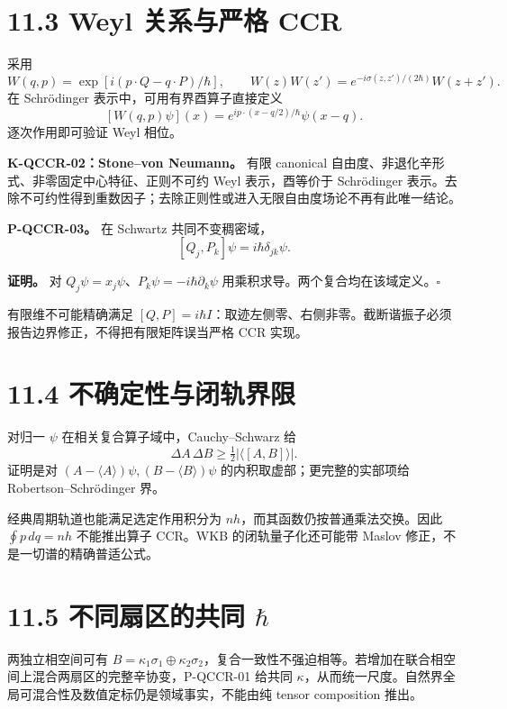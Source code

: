 \documentclass[
  11pt,
  oneside]{book}
\begin{document}
\section{11.3 Weyl 关系与严格 CCR}

采用 \[
W(q,p)=\exp[i(p\cdot Q-q\cdot P)/\hbar],\qquad
W(z)W(z')=e^{-i\sigma(z,z')/(2\hbar)}W(z+z').
\] 在 Schrödinger 表示中，可用有界酉算子直接定义 \[
[W(q,p)\psi](x)=e^{ip\cdot(x-q/2)/\hbar}\psi(x-q).
\] 逐次作用即可验证 Weyl 相位。

\textbf{K-QCCR-02：Stone--von Neumann。} 有限 canonical
自由度、非退化辛形式、非零固定中心特征、正则不可约 Weyl 表示，酉等价于
Schrödinger
表示。去除不可约性得到重数因子；去除正则性或进入无限自由度场论不再有此唯一结论。

\protect\hypertarget{p-qccr-03}{}{}

\textbf{P-QCCR-03。} 在 Schwartz 共同不变稠密域， \[
[Q_j,P_k]\psi=i\hbar\delta_{jk}\psi.
\]

\textbf{证明。} 对
\(Q_j\psi=x_j\psi\)、\(P_k\psi=-i\hbar\partial_k\psi\)
用乘积求导。两个复合均在该域定义。\(\square\)

有限维不可能精确满足
\([Q,P]=i\hbar I\)：取迹左侧零、右侧非零。截断谐振子必须报告边界修正，不得把有限矩阵误当严格
CCR 实现。

\section{11.4 不确定性与闭轨界限}

对归一 \(\psi\) 在相关复合算子域中，Cauchy--Schwarz 给 \[
\Delta A\,\Delta B\ge\tfrac12|\langle[A,B]\rangle|.
\] 证明是对 \((A-\langle A\rangle)\psi,(B-\langle B\rangle)\psi\)
的内积取虚部；更完整的实部项给 Robertson--Schrödinger 界。

经典周期轨道也能满足选定作用积分为
\(nh\)，而其函数仍按普通乘法交换。因此 \(\oint p\,dq=nh\) 不能推出算子
CCR。WKB 的闭轨量子化还可能带 Maslov 修正，不是一切谱的精确普适公式。

\section{\texorpdfstring{11.5 不同扇区的共同
\(\hbar\)}{11.5 不同扇区的共同 \textbackslash hbar}}

两独立相空间可有
\(B=\kappa_1\sigma_1\oplus\kappa_2\sigma_2\)，复合一致性不强迫相等。若增加在联合相空间上混合两扇区的完整辛协变，P-QCCR-01
给共同
\(\kappa\)，从而统一尺度。自然界全局可混合性及数值定标仍是领域事实，不能由纯
tensor composition 推出。
\end{document}
